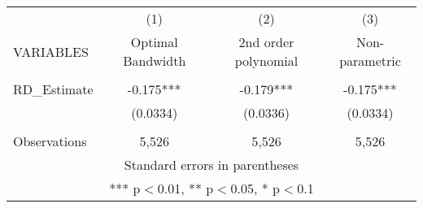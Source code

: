 \documentclass[]{article}
\begin{document}
\begin{tabular}{lccc} \hline
 & (1) & (2) & (3) \\
VARIABLES & Optimal Bandwidth & 2nd order polynomial & Non-parametric \\ \hline
 &  &  &  \\
RD\_Estimate & -0.175*** & -0.179*** & -0.175*** \\
 & (0.0334) & (0.0336) & (0.0334) \\
 &  &  &  \\
 Observations & 5,526 & 5,526 & 5,526 \\ \hline
\multicolumn{4}{c}{ Standard errors in parentheses} \\
\multicolumn{4}{c}{ *** p$<$0.01, ** p$<$0.05, * p$<$0.1} \\
\end{tabular}
\end{document}
